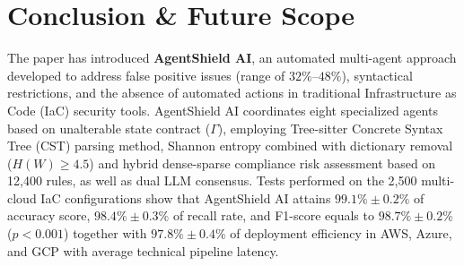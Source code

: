 \documentclass[runningheads]{llncs}
\begin{document}
\begin{table}[t]
\centering
\caption{Enterprise Cost \& Operational Impact Analysis.}
\label{tab:cost}
\setlength{\tabcolsep}{4.5pt}
\end{table}


\section{Conclusion \& Future Scope}
The paper has introduced \textbf{AgentShield AI}, an automated multi-agent approach developed to address false positive issues (range of $32\%$--$48\%$), syntactical restrictions, and the absence of automated actions in traditional Infrastructure as Code (IaC) security tools. AgentShield AI coordinates eight specialized agents based on unalterable state contract ($\Gamma$), employing Tree-sitter Concrete Syntax Tree (CST) parsing method, Shannon entropy combined with dictionary removal ($H(W) \ge 4.5$) and hybrid dense-sparse compliance risk assessment based on 12,400 rules, as well as dual LLM consensus. Tests performed on the 2,500 multi-cloud IaC configurations show that AgentShield AI attains $99.1\% \pm 0.2\%$ of accuracy score, $98.4\% \pm 0.3\%$ of recall rate, and F1-score equals to $98.7\% \pm 0.2\%$ ($p < 0.001$) together with $97.8\% \pm 0.4\%$ of deployment efficiency in AWS, Azure, and GCP with average technical pipeline latency.
\end{document}
